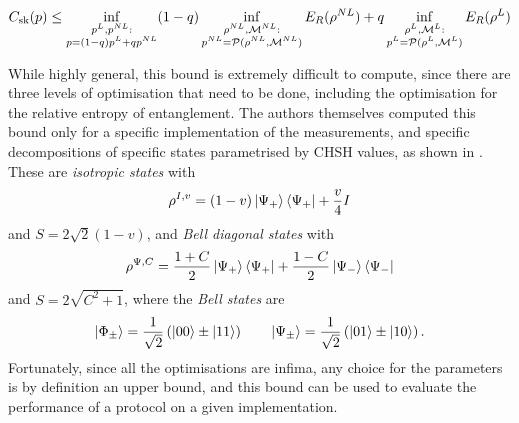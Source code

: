 \documentclass[10pt, a4paper]{article}
\numberwithin{equation}{section} %
\theoremstyle{definition}
\theoremstyle{plain}
\newcommand{\?}{\mathrel{?}} %
\newcommand{\sM}{\mathcal{M}}
\newcommand{\cP}{\mathcal{P}}
\newcommand{\sk}{\rm sk}
\begin{document}
        \[ C_{\sk}(p) \leq \inf_{\substack{p^{L}, p^{NL} : \\ p = (1-q)p^{L} + qp^{NL}}} (1-q) \inf_{\substack{\rho^{NL}, \sM^{NL} : \\ p^{NL} = \cP(\rho^{NL}, \sM^{NL}) }} E_R(\rho^{NL}) + q \inf_{\substack{\rho^{L}, \sM^{L} : \\ p^{L} = \cP(\rho^{L}, \sM^{L}) }} E_R(\rho^L) \]

      While highly general, this bound is extremely difficult to compute, since there are three levels of optimisation that need to be done, including the optimisation for the relative entropy of entanglement. The authors themselves computed this bound only for a specific implementation of the measurements, and specific decompositions of specific states parametrised by CHSH values, as shown in . These are \emph{isotropic states} with
      \begin{equation}
        \rho^{I,v} = (1-v)\ket{\Psi_+}\bra{\Psi_+} + \frac{v}{4}I
      \end{equation}
      and \(S = 2\sqrt{2}(1-v)\), and \emph{Bell diagonal states} with
      \begin{equation}
        \rho^{\Psi,C} = \frac{1+C}{2}\ket{\Psi_+}\bra{\Psi_+} + \frac{1-C}{2}\ket{\Psi_-}\bra{\Psi_-}
      \end{equation}
      and \(S = 2\sqrt{C^2+1}\), where the \emph{Bell states} are
      \begin{equation}
        \ket{\Phi_{\pm}} = \frac{1}{\sqrt{2}}\left( \ket{00} \pm \ket{11} \right) \qquad \ket{\Psi_{\pm}} = \frac{1}{\sqrt{2}}\left( \ket{01} \pm \ket{10} \right).
      \end{equation}
      Fortunately, since all the optimisations are infima, any choice for the parameters is by definition an upper bound, and this bound can be used to evaluate the performance of a protocol on a given implementation.

\end{document}
